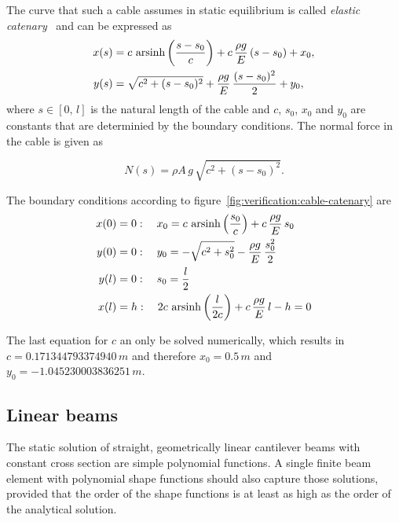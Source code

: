 The curve that such a cable assumes in static equilibrium is called \textit{elastic catenary}~\cite{bib:catenary} and can be expressed as
%
\begin{align}
x(s) &= c\,\operatorname*{arsinh} \left(\frac{s - s_{0}}{c}\right) + c\,\frac{\rho g}{E}\,(s - s_{0}) + x_{0}, \\
y(s) &= \sqrt{c^2 + (s - s_{0})^2} + \frac{\rho g}{E}\,\frac{(s - s_{0})^2}{2} + y_{0},
\end{align}
%
where $s \in [0,\,l]$ is the natural length of the cable and $c$, $s_{0}$, $x_{0}$ and $y_{0}$ are constants that are determinied by the boundary conditions.
The normal force in the cable is given as

\begin{equation}
N(s) = \rho A\,g\,\sqrt{c^2 + (s - s_{0})^2}.
\end{equation}

The boundary conditions according to figure~\ref{fig:verification:cable-catenary} are
%
\begin{align}
x(0) &= 0: \quad x_{0} = c\,\operatorname*{arsinh} \left(\frac{s_{0}}{c}\right) + c\,\frac{\rho g}{E}\,s_{0} \\
y(0) &= 0: \quad y_{0} = -\sqrt{c^2 + s_{0}^2} - \frac{\rho g}{E}\,\frac{s_{0}^2}{2} \\
y(l) &= 0: \quad s_{0} = \frac{l}{2} \\
x(l) &= h: \quad 2c\,\operatorname*{arsinh} \left(\frac{l}{2c}\right) + c\,\frac{\rho g}{E}\,l - h = 0
\end{align}

The last equation for $c$ an only be solved numerically, which results in $c = 0.171344793374940\,\unit{m}$ and therefore $x_{0} = 0.5\,\unit{m}$ and $y_{0} = -1.045230003836251\,\unit{m}$.

%
% 
% 
% 
% 
% 

\newpage
\subsection*{Linear beams}

The static solution of straight, geometrically linear cantilever beams with constant cross section are simple polynomial functions.
A single finite beam element with polynomial shape functions should also capture those solutions, provided that the order of the shape functions is at least as high as the order of the analytical solution.

